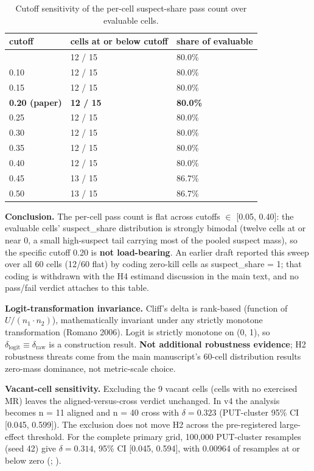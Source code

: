 \documentclass[manuscript,screen,review]{acmart}
\begin{document}
{%
\begin{longtable}[]{@{}lll@{}}
\caption{Cutoff sensitivity of the per-cell suspect-share pass count
over evaluable cells.}\label{tab:p2-22}\\
\toprule\noalign{}
cutoff & cells at or below cutoff & share of evaluable \\
\midrule\noalign{}
\endfirsthead
\endhead
\bottomrule\noalign{}
\endlastfoot
0.05 & 12 / 15 & 80.0\% \\
0.10 & 12 / 15 & 80.0\% \\
0.15 & 12 / 15 & 80.0\% \\
\textbf{0.20 (paper)} & \textbf{12 / 15} & \textbf{80.0\%} \\
0.25 & 12 / 15 & 80.0\% \\
0.30 & 12 / 15 & 80.0\% \\
0.35 & 12 / 15 & 80.0\% \\
0.40 & 12 / 15 & 80.0\% \\
0.45 & 13 / 15 & 86.7\% \\
0.50 & 13 / 15 & 86.7\% \\
\end{longtable}
}

\textbf{Conclusion.} The per-cell pass count is flat across cutoffs
$\in$ {[}0.05, 0.40{]}: the evaluable cells' suspect\_share
distribution is strongly bimodal (twelve cells at or near 0, a small
high-suspect tail carrying most of the pooled suspect mass), so the
specific cutoff 0.20 is \textbf{not load-bearing}. An earlier draft
reported this sweep over all 60 cells (12/60 flat) by coding zero-kill
cells as suspect\_share = 1; that coding is withdrawn with the H4
estimand discussion in the main text, and no pass/fail verdict attaches
to this table.

\textbf{Logit-transformation invariance.} Cliff's delta is rank-based
(function of $U / (n_1 \cdot n_2)$), mathematically invariant under any strictly
monotone transformation (Romano 2006). Logit is strictly monotone on (0,
1), so $\delta_{\mathrm{logit}} \equiv \delta_{\mathrm{raw}}$ is a construction result. \textbf{Not
additional robustness evidence}; H2 robustness threats come from the main manuscript's 60-cell distribution results
zero-mass dominance, not metric-scale choice.

\textbf{Vacant-cell sensitivity.} Excluding the 9 vacant cells (cells
with no exercised MR) leaves the aligned-versus-cross verdict unchanged.
In v4 the analysis becomes n = 11 aligned and n = 40 cross with
$\delta = 0.323$ (PUT-cluster 95\% CI [0.045, 0.599]). The exclusion
does not move H2 across the pre-registered large-effect threshold.
For the complete primary grid, 100,000 PUT-cluster resamples (seed 42)
give \(\delta=0.314\), 95\% CI [0.045, 0.594], with 0.00964 of
resamples at or below zero
(;
).
\end{document}
